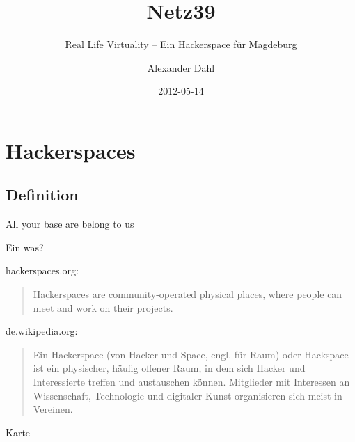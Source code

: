 \documentclass[hyperref={pdfpagelabels=false}]{beamer}
\title[Netz39]{Netz39}
\subtitle{Real Life Virtuality -- Ein Hackerspace für Magdeburg}
\author{Alexander Dahl}
\institute[netz39.de]{\url{http://www.netz39.de/}}
\date{2012-05-14}
\begin{document}
\begin{frame}
	\titlepage
\end{frame}


\section{Hackerspaces}

\subsection{Definition}

\begin{frame}[label=secinvaders]{All your base are belong to us}
    \begin{figure}
    \end{figure}
\end{frame}

\begin{frame}{Ein was?}
    \begin{block}{hackerspaces.org:}
        \begin{quote}
            Hackerspaces are community-operated physical places, where 
            people can meet and work on their projects.
        \end{quote}
    \end{block}
    \pause
    \begin{block}{de.wikipedia.org:}
        \begin{quote}
            Ein Hackerspace (von Hacker und Space, engl. für Raum) oder
            Hackspace ist ein physischer, häufig offener Raum, in dem 
            sich Hacker und Interessierte treffen und austauschen 
            können. Mitglieder mit Interessen an Wissenschaft, 
            Technologie und digitaler Kunst organisieren sich meist in 
            Vereinen.
        \end{quote}
    \end{block}
\end{frame}

\begin{frame}[label=secmap]{Karte}
    \begin{figure}
    \end{figure}
\end{frame}
\end{document}
